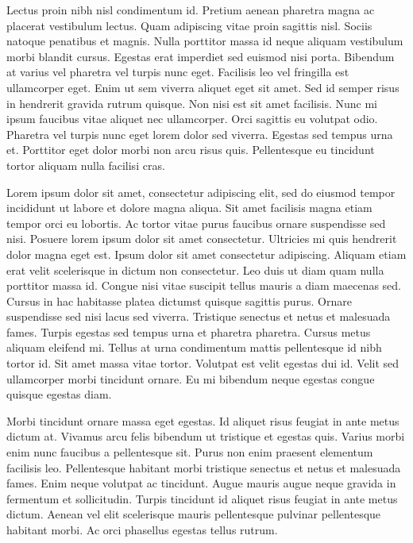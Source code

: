 \documentclass[11pt,a4paper]{article}
\begin{document}
Lectus proin nibh nisl condimentum id. Pretium aenean pharetra magna ac placerat vestibulum lectus. Quam adipiscing vitae proin sagittis nisl. Sociis natoque penatibus et magnis. Nulla porttitor massa id neque aliquam vestibulum morbi blandit cursus. Egestas erat imperdiet sed euismod nisi porta. Bibendum at varius vel pharetra vel turpis nunc eget. Facilisis leo vel fringilla est ullamcorper eget. Enim ut sem viverra aliquet eget sit amet. Sed id semper risus in hendrerit gravida rutrum quisque. Non nisi est sit amet facilisis. Nunc mi ipsum faucibus vitae aliquet nec ullamcorper. Orci sagittis eu volutpat odio. Pharetra vel turpis nunc eget lorem dolor sed viverra. Egestas sed tempus urna et. Porttitor eget dolor morbi non arcu risus quis. Pellentesque eu tincidunt tortor aliquam nulla facilisi cras.

Lorem ipsum dolor sit amet, consectetur adipiscing elit, sed do eiusmod tempor incididunt ut labore et dolore magna aliqua. Sit amet facilisis magna etiam tempor orci eu lobortis. Ac tortor vitae purus faucibus ornare suspendisse sed nisi. Posuere lorem ipsum dolor sit amet consectetur. Ultricies mi quis hendrerit dolor magna eget est. Ipsum dolor sit amet consectetur adipiscing. Aliquam etiam erat velit scelerisque in dictum non consectetur. Leo duis ut diam quam nulla porttitor massa id. Congue nisi vitae suscipit tellus mauris a diam maecenas sed. Cursus in hac habitasse platea dictumst quisque sagittis purus. Ornare suspendisse sed nisi lacus sed viverra. Tristique senectus et netus et malesuada fames. Turpis egestas sed tempus urna et pharetra pharetra. Cursus metus aliquam eleifend mi. Tellus at urna condimentum mattis pellentesque id nibh tortor id. Sit amet massa vitae tortor. Volutpat est velit egestas dui id. Velit sed ullamcorper morbi tincidunt ornare. Eu mi bibendum neque egestas congue quisque egestas diam.

Morbi tincidunt ornare massa eget egestas. Id aliquet risus feugiat in ante metus dictum at. Vivamus arcu felis bibendum ut tristique et egestas quis. Varius morbi enim nunc faucibus a pellentesque sit. Purus non enim praesent elementum facilisis leo. Pellentesque habitant morbi tristique senectus et netus et malesuada fames. Enim neque volutpat ac tincidunt. Augue mauris augue neque gravida in fermentum et sollicitudin. Turpis tincidunt id aliquet risus feugiat in ante metus dictum. Aenean vel elit scelerisque mauris pellentesque pulvinar pellentesque habitant morbi. Ac orci phasellus egestas tellus rutrum.
\end{document}
